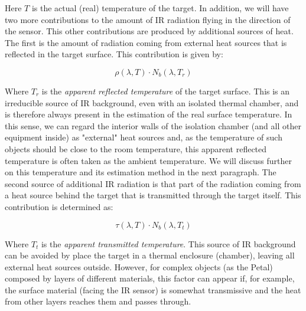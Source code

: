 		Here $T$ is the actual (real) temperature of the target. In addition, we will have two more contributions to the amount of IR radiation flying in the direction of the sensor. This other contributions are produced by additional sources of heat. 
		The first is the amount of radiation coming from external heat sources that is reflected in the target surface. This contribution is given by:
		
		\begin{equation}\label{eq3.2}
			\rho(\lambda,T) \cdot N_{b}(\lambda,T_{r})
		\end{equation}	
	
		Where $T_{r}$ is the \textit{apparent reflected temperature} of the target surface. This is an irreducible source of IR background, even with an isolated thermal chamber, and is therefore always present in the estimation of the real surface temperature. In this sense, we can regard the interior walls of the isolation chamber (and all other equipment inside) as "external" heat sources and, as the temperature of such objects should be close to the room temperature, this apparent reflected temperature is often taken as the ambient temperature. We will discuss further on this temperature and its estimation method in the next paragraph.
		The second source of additional IR radiation is that part of the radiation coming from a heat source behind the target that is transmitted through the target itself. This contribution is determined as:
		
		\begin{equation}\label{eq3.3}
			\tau(\lambda,T) \cdot N_{b}(\lambda,T_{t})
		\end{equation}	
		
		Where $T_{t}$ is the \textit{apparent transmitted temperature}. This source of IR background can be avoided by place the target in a thermal enclosure (chamber), leaving all external heat sources outside. However, for complex objects (as the Petal) composed by layers of different materials, this factor can appear if, for example, the surface material (facing the IR sensor) is somewhat transmissive and the heat from other layers reaches them and passes through.
		
